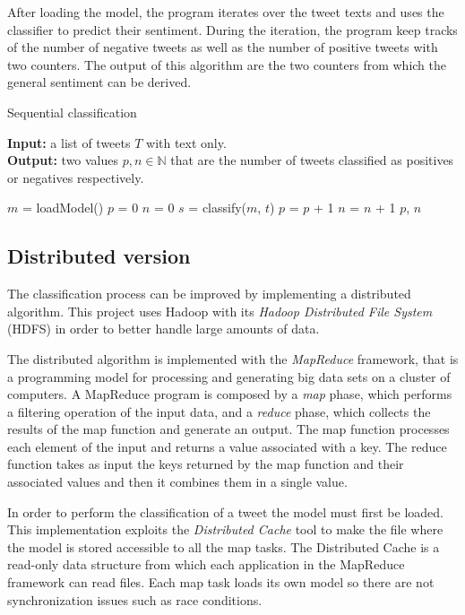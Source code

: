 \documentclass[10pt,twocolumn,letterpaper]{article}
\begin{document}
After loading the model, the program iterates over the tweet texts and uses the classifier to predict their sentiment. During the iteration, the program keep tracks of the number of negative tweets as well as the number of positive tweets with two counters. The output of this algorithm are the two counters from which the general sentiment can be derived.

\begin{algorithm}[H]
\caption{Sequential classification}
\textbf{Input:} a list of tweets $T$ with text only. \\
\textbf{Output:} two values $p, n \in \mathbb{N}$ that are the number of tweets classified as positives or negatives respectively. \\
\begin{algorithmic}

    \State $m$ = loadModel()
    \State $p$ = 0
    \State $n$ = 0
        \State $s$ = classify($m$, $t$)
            \State $p$ = $p$ + 1
        \Else
            \State $n$ = $n$ + 1
        \EndIf
    \EndFor
    \State \Return $p$, $n$

\end{algorithmic}
\end{algorithm}

\subsection{Distributed version}

The classification process can be improved by implementing a distributed algorithm. This project uses Hadoop with its \textit{Hadoop Distributed File System} (HDFS) in order to better handle large amounts of data.

The distributed algorithm is implemented with the \textit{MapReduce} framework, that is a programming model for processing and generating big data sets on a cluster of computers. A MapReduce program is composed by a \textit{map} phase, which performs a filtering operation of the input data, and a \textit{reduce} phase, which collects the results of the map function and generate an output. The map function processes each element of the input and returns a value associated with a key. The reduce function takes as input the keys returned by the map function and their associated values and then it combines them in a single value.

In order to perform the classification of a tweet the model must first be loaded. This implementation exploits the \textit{Distributed Cache} tool to make the file where the model is stored accessible to all the map tasks. The Distributed Cache is a read-only data structure from which each application in the MapReduce framework can read files. Each map task loads its own model so there are not synchronization issues such as race conditions.
\end{document}
